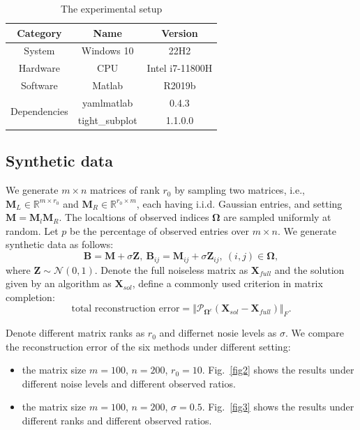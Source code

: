 \documentclass{article}
\begin{document}
{\begin{table}[ht]
	\caption{The experimental setup}
	\label{config}
	\centering
	\renewcommand{\arraystretch}{2} 
	\begin{tabular}{ccc}
		\toprule
		Category  & Name &  Version \\
		\midrule
        System & Windows 10 & 22H2 \\
		Hardware & CPU & Intel i7-11800H  \\
        Software & Matlab & R2019b \\
        \multirow{2}{*}{Dependencies} & yamlmatlab\tablefootnote{\url{https://code.google.com/archive/p/yamlmatlab/}}
        & 0.4.3   \\
        & tight\_subplot\tablefootnote{\url{https://www.mathworks.com/matlabcentral/fileexchange/27991-tight_subplot-nh-nw-gap-marg_h-marg_w?s_tid=srchtitle_tight_subplot_1}}
        & 1.1.0.0 \\
		\bottomrule
	\end{tabular}
\end{table}


\subsection{Synthetic data}
We generate $m \times n$ matrices of rank $r_0$ by sampling two matrices, i.e., $\mathbf M_L \in \mathbb{R}^{m \times r_0} $ and $\mathbf M_R \in \mathbb{R}^{r_0 \times m} $, each having i.i.d. Gaussian entries, and setting $\mathbf M=\mathbf M_l \mathbf M_R$. The localtions of observed indices $\mathbf \Omega$ are sampled uniformly at random. Let $p$ be the  percentage of observed entries over $m \times n$. We generate synthetic data as follows:
\begin{equation*}
    \mathbf B = \mathbf M+ \sigma \mathbf Z, \ \mathbf B_{ij} = \mathbf M_{ij} + \sigma \mathbf Z_{ij}, \ (i,j) \in \mathbf \Omega,
\end{equation*}
where $\mathbf Z \sim \mathcal{N} (0,1)$. Denote the full noiseless matrix as $\mathbf X_{full}$ and the solution given by an algorithm as $\mathbf X_{sol}$, define a commonly used criterion in matrix completion:
\begin{equation*}
    \text{total reconstruction error} = \Vert \mathcal{P}_{\mathbf \Omega^c}(\mathbf X_{sol}-\mathbf X_{full})\Vert_F.
\end{equation*}

Denote different matrix ranks as $r_0$ and differnet nosie levels as $\sigma$.
We compare the reconstruction error of the six methods under different setting:
\begin{itemize}
    \item  the matrix size $m =100$, $n=200$, $r_0 = 10$. Fig.~\ref{fig2} shows the results under different noise levels and different observed ratios.
    \item  the matrix size $m =100$, $n=200$, $\sigma = 0.5$. Fig.~\ref{fig3} shows the results under different ranks and different observed ratios.
\end{itemize}

}
\end{document}
